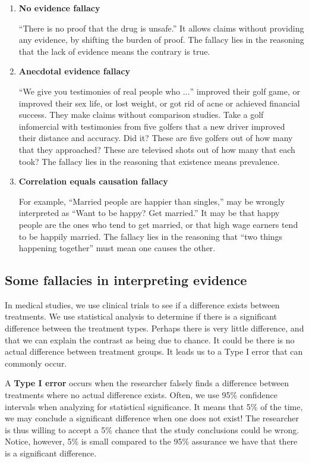\documentclass[11pt]{book}\usepackage[]{graphicx}\usepackage[]{color}
\begin{document}
\begin{enumerate}
\item \textbf{No evidence fallacy}

``There is no proof that the drug is unsafe.''  It allows claims without providing any evidence, by shifting the burden of proof.  The fallacy lies in the reasoning that the lack of evidence means the contrary is true.

\item \textbf{Anecdotal evidence fallacy}

``We give you testimonies of real people who $\dots$'' improved their golf game, or improved their sex life, or lost weight, or got rid of acne or achieved financial success.  They make claims without comparison studies.  Take a golf infomercial with testimonies from five golfers that a new driver improved their distance and accuracy.  Did it?  These are five golfers out of how many that they approached?  These are televised shots out of how many that each took?  The fallacy lies in the reasoning that existence means prevalence.

\item \textbf{Correlation equals causation fallacy}

For example, ``Married people are happier than singles,''  may be wrongly interpreted as ``Want to be happy? Get married.''  It may be that happy people are the ones who tend to get married, or that high wage earners tend to be happily married.  The fallacy lies in the reasoning that ``two things happening together'' must mean one causes the other.
\end{enumerate}

\subsection{Some fallacies in interpreting evidence}     %

In medical studies, we use clinical trials to see if a difference exists between treatments.  We use statistical analysis to determine if there is a significant difference between the treatment types.  Perhaps there is very little difference, and that we can explain the contrast as being due to chance.  It could be there is no actual difference between treatment groups.  It leads us to a Type I error that can commonly occur.

A \textbf{Type I error} occurs when the researcher falsely finds a difference between treatments where no actual difference exists.  Often, we use 95\% confidence intervals when analyzing for statistical significance.  It means that 5\% of the time, we may conclude a significant difference when one does not exist!  The researcher is thus willing to accept a 5\% chance that the study conclusions could be wrong.  Notice, however, 5\% is small compared to the 95\% assurance we have that there is a significant difference.
\end{document}
